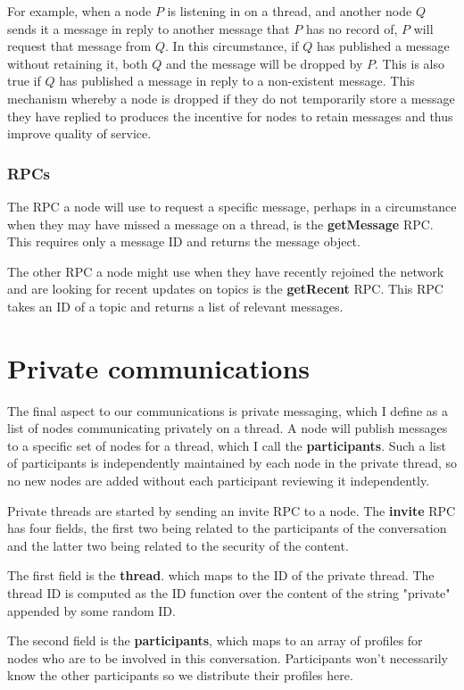 \documentclass[10pt,a4paper,onecolumn]{article}
\begin{document}
For example, when a node $P$ is listening in on a thread, and another node $Q$ sends it a message in reply to another message that $P$ has no record of, $P$ will request that message from $Q$. In this circumstance, if $Q$ has published a message without retaining it, both $Q$ and the message will be dropped by $P$. This is also true if $Q$ has published a message in reply to a non-existent message. This mechanism whereby a node is dropped if they do not temporarily store a message they have replied to produces the incentive for nodes to retain messages and thus improve quality of service.

\subsubsection*{RPCs}
The RPC a node will use to request a specific message, perhaps in a circumstance when they may have missed a message on a thread, is the \textbf{getMessage} RPC. This requires only a message ID and returns the message object. 

The other RPC a node might use when they have recently rejoined the network and are looking for recent updates on topics is the \textbf{getRecent} RPC. This RPC takes an ID of a topic and returns a list of relevant messages.

\section{Private communications}
\label{private}
The final aspect to our communications is private messaging, which I define as a list of nodes communicating privately on a thread. A node will publish messages to a specific set of nodes for a thread, which I call the \textbf{participants}. Such a list of participants is independently maintained by each node in the private thread, so no new nodes are added without each participant reviewing it independently. 

Private threads are started by sending an invite RPC to a node. The \textbf{invite} RPC has four fields, the first two being related to the participants of the conversation and the latter two being related to the security of the content.

The first field is the \textbf{thread}. which maps to the ID of the private thread. The thread ID is computed as the ID function over the content of the string "private" appended by some random ID.

The second field is the \textbf{participants}, which maps to an array of profiles for nodes who are to be involved in this conversation. Participants won't necessarily know the other participants so we distribute their profiles here. 
\end{document}
